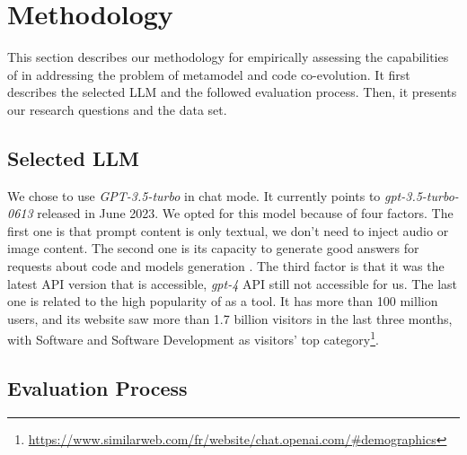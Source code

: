 \section{Methodology}
\label{evaluation}

This section describes our methodology for empirically assessing the capabilities of \LLM in addressing the problem of metamodel and code co-evolution. 
It first describes the selected LLM and the followed evaluation process.
Then, it presents our research questions and the data set.

\subsection{Selected LLM}\label{selectedLLM}

We chose to use \LLM \emph{GPT-3.5-turbo} in chat mode. It currently points to \emph{gpt-3.5-turbo-0613} released in June 2023. We opted for this model because of four factors. The first one is that prompt content is only textual, we don't need to inject audio or image content. The second one is its capacity to generate good answers for requests about code and models generation \cite{nathalia2023artificial,yeticstiren2023evaluating,guo2023exploring,fu2023chatgpt,kabir2023empirical,chaaben2023towards,camara2023assessment}. The third factor is that it was the latest API version that is accessible, \emph{gpt-4} API still not accessible for us. The last one is related to the high popularity of \LLM as a tool. It has more than 100 million users, and its website saw more than 1.7 billion visitors in the last three months, with Software and Software Development as visitors' top category\footnote{\url{https://www.similarweb.com/fr/website/chat.openai.com/\#demographics}}. 


\subsection{Evaluation Process}


